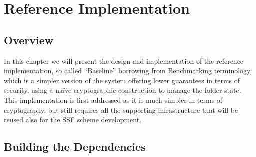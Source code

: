 \chapter{Reference Implementation}\label{ch:reference-implementation}

\section{Overview}

In this chapter we will present the design and implementation of the reference implementation, 
so called ``Baseline'' borrowing from Benchmarking terminology, 
which is a simpler version of the system offering lower guarantees in terms of security,
using a na\"ive cryptographic construction to manage the folder state.
This implementation is first addressed as it is much simpler in terms of cryptography,
but still requires all the supporting infrastructure that will be reused also for the SSF scheme development.

\section{Building the Dependencies}